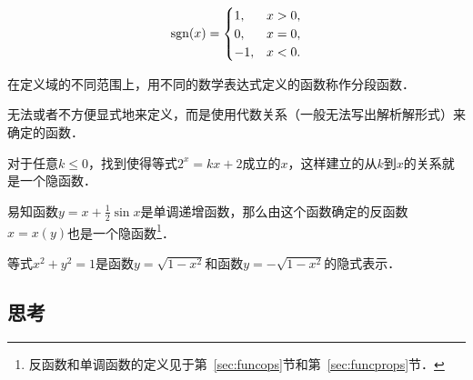 \begin{definition*}
  \[
    \operatorname{sgn}(x) =
    \begin{cases}
      1, & x > 0, \\
      0, & x = 0, \\
      -1, & x < 0.
    \end{cases}
  \]
\end{definition*}

\begin{definition*}[分段函数]
  在定义域的不同范围上，用不同的数学表达式定义的函数称作分段函数．
\end{definition*}

\begin{definition*}[隐函数]
  无法或者不方便显式地来定义，而是使用代数关系（一般无法写出解析解形式）来确定的函数．
\end{definition*}

\begin{example*}
  对于任意\(k \le 0\)，找到使得等式\(2^x = kx + 2\)成立的\(x\)，这样建立的从\(k\)到\(x\)的关系就是一个隐函数．
\end{example*}

\begin{example*}
  易知函数\(y = x + \frac12 \sin x\)是单调递增函数，那么由这个函数确定的反函数\(x = x(y)\)也是一个隐函数\footnote{反函数和单调函数的定义见于第~\ref{sec:funcops}节和第~\ref{sec:funcprops}节．}．
\end{example*}

\begin{example*}
  等式\(x^2 + y^2 = 1\)是函数\(y = \sqrt{1 - x^2}\)和函数\(y = -\sqrt{1 - x^2}\)的隐式表示．
\end{example*}

\subsection*{思考}


